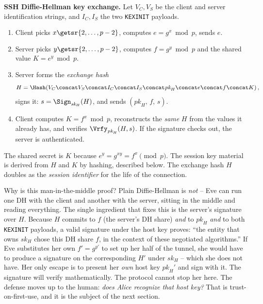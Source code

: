 \begin{formalbox}
\textbf{SSH Diffie-Hellman key exchange.} Let $V_C, V_S$ be the client and server identification strings, and $I_C, I_S$ the two \texttt{KEXINIT} payloads.
\begin{enumerate}
  \item Client picks $x \getsr \{2,\dots,p-2\}$, computes $e = g^{x} \bmod p$, sends $e$.
  \item Server picks $y \getsr \{2,\dots,p-2\}$, computes $f = g^{y} \bmod p$ and the shared value $K = e^{y} \bmod p$.
  \item Server forms the \emph{exchange hash}
  \[
    H = \Hash\!\left(V_C \concat V_S \concat I_C \concat I_S \concat \textit{pk}_H \concat e \concat f \concat K\right),
  \]
  signs it: $s = \Sign_{\textit{sk}_H}(H)$, and sends $(\textit{pk}_H,\, f,\, s)$.
  \item Client computes $K = f^{x} \bmod p$, reconstructs the \emph{same} $H$ from the values it already has, and verifies $\Vrfy_{\textit{pk}_H}(H, s)$. If the signature checks out, the server is authenticated.
\end{enumerate}
The shared secret is $K$ because $e^{y} = g^{xy} = f^{x} \pmod p$. The session key material is derived from $H$ and $K$ by hashing, described below. The exchange hash $H$ doubles as the \emph{session identifier} for the life of the connection.
\end{formalbox}

\begin{whybox}
Why is this man-in-the-middle proof? Plain Diffie-Hellman is \emph{not} -- Eve can run one DH with the client and another with the server, sitting in the middle and reading everything. The single ingredient that fixes this is the server's signature over $H$. Because $H$ commits to $f$ (the server's DH share) \emph{and} to $\textit{pk}_H$ \emph{and} to both \texttt{KEXINIT} payloads, a valid signature under the host key proves: ``the entity that owns $\textit{sk}_H$ chose this DH share $f$, in the context of these negotiated algorithms.'' If Eve substitutes her own $f' = g^{y'}$ to set up her half of the tunnel, she would have to produce a signature on the corresponding $H'$ under $\textit{sk}_H$ -- which she does not have. Her only escape is to present her \emph{own} host key $\textit{pk}_H'$ and sign with it. The signature will verify mathematically. The protocol cannot stop her here. The defense moves up to the human: \emph{does Alice recognize that host key?} That is trust-on-first-use, and it is the subject of the next section.
\end{whybox}

